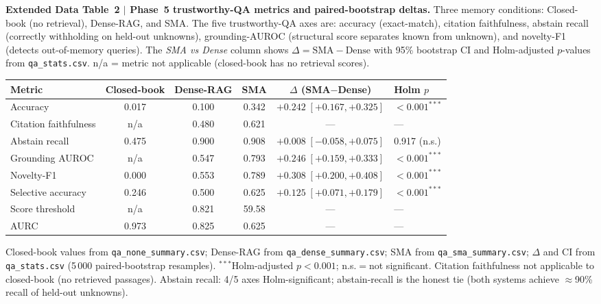 \documentclass[pdflatex,sn-nature]{sn-jnl}
\newcommand{\edcaption}[1]{\par{\small #1}\par\smallskip}
\begin{document}
\begin{appendices}

\begin{table}[htbp]
\centering
\edcaption{\textbf{Extended Data Table~2 $|$ Phase~5 trustworthy-QA metrics and
    paired-bootstrap deltas.}
  Three memory conditions: Closed-book (no retrieval), Dense-RAG, and SMA.
  The five trustworthy-QA axes are: accuracy (exact-match), citation faithfulness,
  abstain recall (correctly withholding on held-out unknowns), grounding-AUROC
  (structural score separates known from unknown), and novelty-F1 (detects
  out-of-memory queries).  The \emph{SMA vs Dense} column shows
  $\Delta = \text{SMA} - \text{Dense}$ with 95\% bootstrap CI and Holm-adjusted
  $p$-values from \texttt{qa\_stats.csv}.
  n/a = metric not applicable (closed-book has no retrieval scores).}
\small
\setlength{\tabcolsep}{5pt}
\begin{adjustbox}{max width=\textwidth}\begin{tabular}{lccccl}
\toprule
\textbf{Metric} & \textbf{Closed-book} & \textbf{Dense-RAG} & \textbf{SMA} &
    \textbf{$\Delta$ (SMA$-$Dense)} & \textbf{Holm $p$} \\
\midrule
Accuracy             & 0.017 & 0.100 & 0.342 & $+0.242\;[+0.167,+0.325]$ & $<0.001^{***}$ \\
Citation faithfulness & n/a  & 0.480 & 0.621 & — & — \\
Abstain recall       & 0.475 & 0.900 & 0.908 & $+0.008\;[-0.058,+0.075]$ & 0.917 (n.s.) \\
Grounding AUROC      & n/a   & 0.547 & 0.793 & $+0.246\;[+0.159,+0.333]$ & $<0.001^{***}$ \\
Novelty-F1           & 0.000 & 0.553 & 0.789 & $+0.308\;[+0.200,+0.408]$ & $<0.001^{***}$ \\
Selective accuracy   & 0.246 & 0.500 & 0.625 & $+0.125\;[+0.071,+0.179]$ & $<0.001^{***}$ \\
\midrule
Score threshold      & n/a   & 0.821 & 59.58 & — & — \\
AURC                 & 0.973 & 0.825 & 0.625 & — & — \\
\bottomrule
\end{tabular}\end{adjustbox}
\begin{flushleft}
{\footnotesize
Closed-book values from \texttt{qa\_none\_summary.csv}; Dense-RAG from
\texttt{qa\_dense\_summary.csv}; SMA from \texttt{qa\_sma\_summary.csv};
$\Delta$ and CI from \texttt{qa\_stats.csv} (5\,000 paired-bootstrap resamples).
$^{***}$Holm-adjusted $p<0.001$; n.s.$=$not significant.
Citation faithfulness not applicable to closed-book (no retrieved passages).
Abstain recall: 4/5 axes Holm-significant; abstain-recall is the honest tie
(both systems achieve $\approx$90\% recall of held-out unknowns).}
\end{flushleft}
\label{tab:ed2_trustworthy_qa}
\end{table}



\end{appendices}
\end{document}
